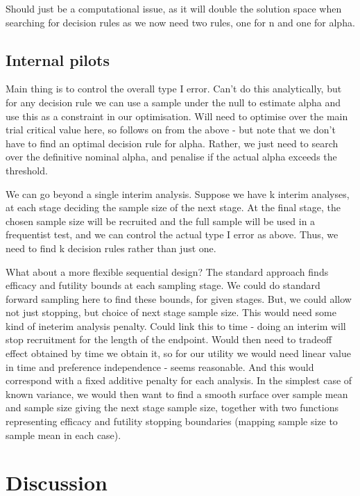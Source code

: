 \documentclass[sagev, Crown]{sagej} %
\begin{document}
Should just be a computational issue, as it will double the solution space when searching for decision rules as we now need two rules, one for n and one for alpha.


\subsection{Internal pilots}

Main thing is to control the overall type I error. Can't do this analytically, but for any decision rule we can use a sample under the null to estimate alpha and use this as a constraint in our optimisation. Will need to optimise over the main trial critical value here, so follows on from the above - but note that we don't have to find an optimal decision rule for alpha. Rather, we just need to search over the definitive nominal alpha, and penalise if the actual alpha exceeds the threshold.

We can go beyond a single interim analysis. Suppose we have k interim analyses, at each stage deciding the sample size of the next stage. At the final stage, the chosen sample size will be recruited and the full sample will be used in a frequentist test, and we can control the actual type I error as above. Thus, we need to find k decision rules rather than just one. 

What about a more flexible sequential design? The standard approach finds efficacy and futility bounds at each sampling stage. We could do standard forward sampling here to find these bounds, for given stages. But, we could allow not just stopping, but choice of next stage sample size. This would need some kind of ineterim analysis penalty. Could link this to time - doing an interim will stop recruitment for the length of the endpoint. Would then need to tradeoff effect obtained by time we obtain it, so for our utility we would need linear value in time and preference independence - seems reasonable. And this would correspond with a fixed additive penalty for each analysis. In the simplest case of known variance, we would then want to find a smooth surface over sample mean and sample size giving the next stage sample size, together with two functions representing efficacy and futility stopping boundaries (mapping sample size to sample mean in each case).



\section{Discussion}
\end{document}
